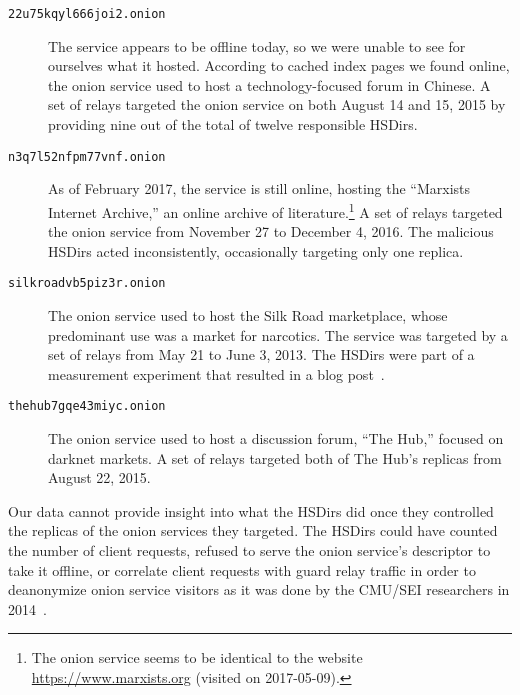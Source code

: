 \begin{description}
	\item[\texttt{22u75kqyl666joi2.onion}] The service appears to be offline
		today, so we were unable to see for ourselves what it hosted.  According
		to cached index pages we found online, the onion service used to host a
		technology-focused forum in Chinese.  A set of relays targeted the onion
		service on both August 14 and 15, 2015 by providing nine out of the
		total of twelve responsible HSDirs.

	\item[\texttt{n3q7l52nfpm77vnf.onion}] As of February 2017, the service is
		still online, hosting the ``Marxists Internet Archive,'' an online
		archive of literature.\footnote{The onion service seems to be identical
		to the website \url{https://www.marxists.org} (visited on 2017-05-09).}
		A set of relays targeted the onion service from November 27 to December
		4, 2016.  The malicious HSDirs acted inconsistently, occasionally
		targeting only one replica.

	\item[\texttt{silkroadvb5piz3r.onion}] The onion service used to host the
		Silk Road marketplace, whose predominant use was a market for narcotics.
		The service was targeted by a set of relays from May 21 to June 3, 2013.
		The HSDirs were part of a measurement experiment that resulted in a blog
		post~\cite{OCearbhaill2013a}.

	\item[\texttt{thehub7gqe43miyc.onion}] The onion service used to host a
		discussion forum, ``The Hub,'' focused on darknet markets.  A set of
		relays targeted both of The Hub's replicas from August 22, 2015.
\end{description}

Our data cannot provide insight into what the HSDirs did once they controlled
the replicas of the onion services they targeted.  The HSDirs could have counted
the number of client requests, refused to serve the onion service's descriptor
to take it offline, or correlate client requests with guard relay traffic in
order to deanonymize onion service visitors as it was done by the CMU/SEI
researchers in 2014~\cite{Dingledine2014a}.
